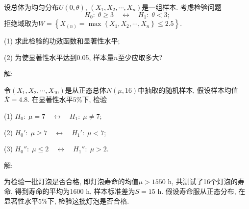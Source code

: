 \documentclass[standard]{ExBook}
\begin{document}
\begin{qitems}
\vspace{-5em}

    \begin{bbox} 
    \begin{shaded}
        \qitem
设总体为均匀分布$U(0, \theta)$, $\left(X_1,X_2,\cdots, X_n\right)$是一组样本. 考虑检验问题
\[
H_0: \; \theta \ge 3 \quad \longleftrightarrow \quad H_1: \; \theta < 3;
\]
拒绝域取为$W = \left\{X_{(n)} = \max\left\{X_1,X_2,\cdots,X_n\right\} \leq 2.5\right\}$.

(1) 求此检验的功效函数和显著性水平;

(2) 为使显著性水平达到0.05, 样本量$n$至少应取多大?
    \end{shaded}
    \end{bbox}

\vspace{-5em}

    \begin{bbox}
解: 
    \end{bbox}

\vspace{-5em}

    \begin{bbox} 
    \begin{shaded}
        \qitem
令$\left(X_1,X_2,\cdots,X_{10}\right)$是从正态总体$N(\mu, 16)$中抽取的随机样本, 假设样本均值$\overline{X} = 4.8$. 在显著性水平$5\%$下, 检验

(1) $H_0: \; \mu = 7 \quad \longleftrightarrow \quad H_1: \; \mu \neq 7$;

(2) $H_0': \; \mu \ge 7 \quad \longleftrightarrow \quad H_1': \; \mu < 7$;

(3) $H_0'': \; \mu \le 2 \quad \longleftrightarrow \quad H_1'': \; \mu > 2$.
    \end{shaded}
    \end{bbox}

\vspace{-5em}

    \begin{bbox}
解: 
    \end{bbox}

\vspace{-5em}

    \begin{bbox} 
    \begin{shaded}
        \qitem
为检验一批灯泡是否合格, 即灯泡寿命的均值$\mu > 1550$ h, 共测试了16个灯泡的寿命, 得到寿命的平均为1600 h, 样本标准差为$S = 15$ h. 假设寿命服从正态分布, 在显著性水平$5\%$下, 检验这批灯泡是否合格.
    \end{shaded}
    \end{bbox}



\end{qitems}
\end{document}
